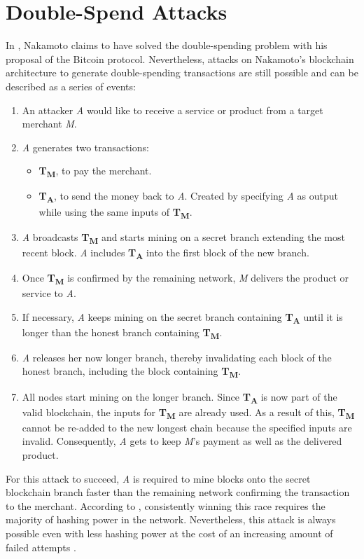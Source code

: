 \documentclass[a4paper,12pt,twoside]{report}
\begin{document}
\section{Double-Spend Attacks} \label{dsa}
\begin{sloppypar} In \cite{nakamoto2008bitcoin}, Nakamoto claims to have solved the double-spending problem with his proposal of the Bitcoin protocol. Nevertheless, attacks on Nakamoto's blockchain architecture to generate double-spending transactions are still possible and can be described as a series of events: \end{sloppypar}
\begin{enumerate}
\item An attacker \textit{A} would like to receive a service or product from a target merchant \textit{M}.
\item \textit{A} generates two transactions:
\begin{itemize}
\item \textbf{T\textsubscript{M}}, to pay the merchant.
\item \textbf{T\textsubscript{A}}, to send the money back to \textit{A}. Created by specifying \textit{A} as output while using the same inputs of \textbf{T\textsubscript{M}}.
\end{itemize}
\item \textit{A} broadcasts \textbf{T\textsubscript{M}} and starts mining on a secret branch extending the most recent block. \textit{A} includes \textbf{T\textsubscript{A}} into the first block of the new branch.
\item Once \textbf{T\textsubscript{M}} is confirmed by the remaining network, \textit{M} delivers the product or service to \textit{A}.
\item If necessary, \textit{A} keeps mining on the secret branch containing \textbf{T\textsubscript{A}} until it is longer than the honest branch containing \textbf{T\textsubscript{M}}.
\item \textit{A} releases her now longer branch, thereby invalidating each block of the honest branch, including the block containing \textbf{T\textsubscript{M}}.
\item All nodes start mining on the longer branch. Since \textbf{T\textsubscript{A}} is now part of the valid blockchain, the inputs for \textbf{T\textsubscript{M}} are already used. As a result of this, \textbf{T\textsubscript{M}} cannot be re-added to the new longest chain because the specified inputs are invalid. Consequently, \textit{A} gets to keep \textit{M}'s payment as well as the delivered product.
\end{enumerate}
For this attack to succeed, \textit{A} is required to mine blocks onto the secret blockchain branch faster than the remaining network confirming the transaction to the merchant. According to \cite{nakamoto2008bitcoin}, consistently winning this race requires the majority of hashing power in the network. Nevertheless, this attack is always possible even with less hashing power at the cost of an increasing amount of failed attempts \cite{HBDSA,DSAwithTime}.
\end{document}
